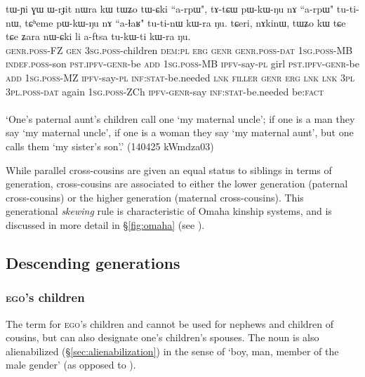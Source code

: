 \begin{exe}
\ex \label{ex:MBCh.FZCh}
\gll tɯ-ɲi ɣɯ ɯ-rɟit nɯra kɯ tɯʑo tɯ-ɕki ``a-rpɯ", tɤ-tɕɯ pɯ-kɯ-ŋu nɤ ``a-rpɯ" tu-ti-nɯ, tɕʰeme pɯ-kɯ-ŋu nɤ ``a-ɬaʁ" tu-ti-nɯ kɯ-ra ŋu. tɕeri, nɤkinɯ, tɯʑo kɯ tɕe tɕe ʑara nɯ-ɕki li a-ftsa tu-kɯ-ti kɯ-ra ŋu. \\
\textsc{genr}.\textsc{poss}-FZ \textsc{gen} \textsc{3sg}.\textsc{poss}-children \textsc{dem}:\textsc{pl} \textsc{erg} \textsc{genr} \textsc{genr}.\textsc{poss}-\textsc{dat} \textsc{1sg}.\textsc{poss}-MB \textsc{indef}.\textsc{poss}-son \textsc{pst}.\textsc{ipfv}-\textsc{genr}-be \textsc{add} \textsc{1sg}.\textsc{poss}-MB \textsc{ipfv}-say-\textsc{pl} girl \textsc{pst}.\textsc{ipfv}-\textsc{genr}-be \textsc{add} \textsc{1sg}.\textsc{poss}-MZ \textsc{ipfv}-say-\textsc{pl} \textsc{inf}:\textsc{stat}-be.needed \textsc{lnk} \textsc{filler} \textsc{genr} \textsc{erg} \textsc{lnk} \textsc{lnk} \textsc{3pl} \textsc{3pl}.\textsc{poss}-\textsc{dat} again \textsc{1sg}.\textsc{poss}-ZCh \textsc{ipfv}-\textsc{genr}-say \textsc{inf}:\textsc{stat}-be.needed be:\textsc{fact} \\
\\
\glt `One's paternal aunt's children call one  `my maternal uncle'; if one is a man they say `my maternal uncle', if one is a woman they say  `my maternal aunt', but one calls them  `my sister's son'.' (140425 kWmdza03)
\end{exe}

While parallel cross-cousins are given an equal status to siblings in terms of generation, cross-cousins are associated to either the lower generation (paternal cross-cousins) or the higher generation (maternal cross-cousins). This generational \textit{skewing} rule is characteristic of Omaha kinship systems, and is discussed in more detail in §\ref{fig:omaha} (see ).

\subsection{Descending generations} \label{sec:G-1}

\subsubsection{\textsc{ego}'s children}
The term for \textsc{ego}'s children  and  cannot be used for nephews and children of cousins, but can also designate one's children's spouses. The noun  is also alienabilized (§\ref{sec:alienabilization}) in the sense of `boy, man, member of the male gender' (as opposed to ).

